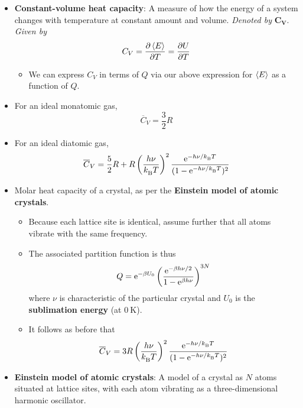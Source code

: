 \documentclass[../notes.tex]{subfiles}
\begin{document}
\begin{itemize}
\begin{itemize}
    \end{itemize}
    \item \textbf{Constant-volume heat capacity}: A measure of how the energy of a system changes with temperature at constant amount and volume. \emph{Denoted by} $\bm{C_V}$. \emph{Given by}
    \begin{equation*}
        C_V = \pdv{\prb{E}}{T} = \pdv{U}{T}
    \end{equation*}
    \begin{itemize}
        \item We can express $C_V$ in terms of $Q$ via our above expression for $\prb{E}$ as a function of $Q$.
    \end{itemize}
    \item For an ideal monatomic gas,
    \begin{equation*}
        \overline{C}_V = \frac{3}{2}R
    \end{equation*}
    \item For an ideal diatomic gas,
    \begin{equation*}
        \overline{C}_V = \frac{5}{2}R+R\left( \frac{h\nu}{\kB T} \right)^2\frac{\e[-h\nu/\kB T]}{(1-\e[-h\nu/\kB T])^2}
    \end{equation*}
    \item Molar heat capacity of a crystal, as per the \textbf{Einstein model of atomic crystals}.
    \begin{itemize}
        \item Because each lattice site is identical, assume further that all atoms vibrate with the same frequency.
        \item The associated partition function is thus
        \begin{equation*}
            Q = \e[-\beta U_0]\left( \frac{\e[-\beta h\nu/2]}{1-\e[\beta h\nu]} \right)^{3N}
        \end{equation*}
        where $\nu$ is characteristic of the particular crystal and $U_0$ is the \textbf{sublimation energy} (at $\SI{0}{\kelvin}$).
        \item It follows as before that
        \begin{equation*}
            \overline{C}_V = 3R\left( \frac{h\nu}{\kB T} \right)^2\frac{\e[-h\nu/\kB T]}{(1-\e[-h\nu/\kB T])^2}
        \end{equation*}
    \end{itemize}
    \item \textbf{Einstein model of atomic crystals}: A model of a crystal as $N$ atoms situated at lattice sites, with each atom vibrating as a three-dimensional harmonic oscillator.

\end{itemize}
\end{document}
